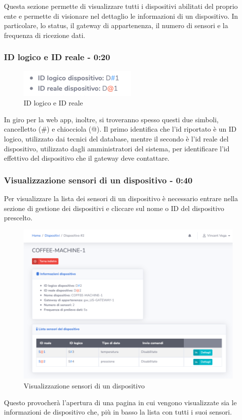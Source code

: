 		Questa sezione permette di visualizzare tutti i dispositivi abilitati del proprio ente e permette di visionare nel dettaglio le informazioni di un dispositivo.
		In particolare, lo status, il gateway di appartenenza, il numero di sensori e la frequenza di ricezione dati. 


	\subsubsection{ID logico e ID reale - 0:20}
		\begin{figure}[H]
		\centering
		\includegraphics[scale=0.600]{res/images/membro/IDLogicoIDReale.png}
		\caption{ID logico e ID reale}
		\end{figure}
		In giro per la web app, inoltre, si troveranno spesso questi due simboli, cancelletto (\#) e chiocciola (@). Il primo identifica che l'id riportato è un ID logico, utilizzato dai tecnici del database, mentre il secondo è l'id reale del dispositivo, utilizzato dagli amministratori del sistema, per identificare l'id effettivo del dispositivo che il gateway deve contattare.

	\subsubsection{Visualizzazione sensori di un dispositivo - 0:40}
		Per visualizzare la lista dei sensori di un dispositivo è necessario entrare nella sezione di gestione dei dispositivi e cliccare sul nome o ID del dispositivo prescelto.
		\begin{figure}[H]
		\centering
		\includegraphics[scale=0.600]{res/images/membro/visSensori.png}
		\caption{Visualizzazione sensori di un dispositivo}
		\end{figure}
		Questo provocherà l'apertura di una pagina in cui vengono visualizzate sia le informazioni de dispositivo che, più in basso la lista con tutti i suoi sensori.

